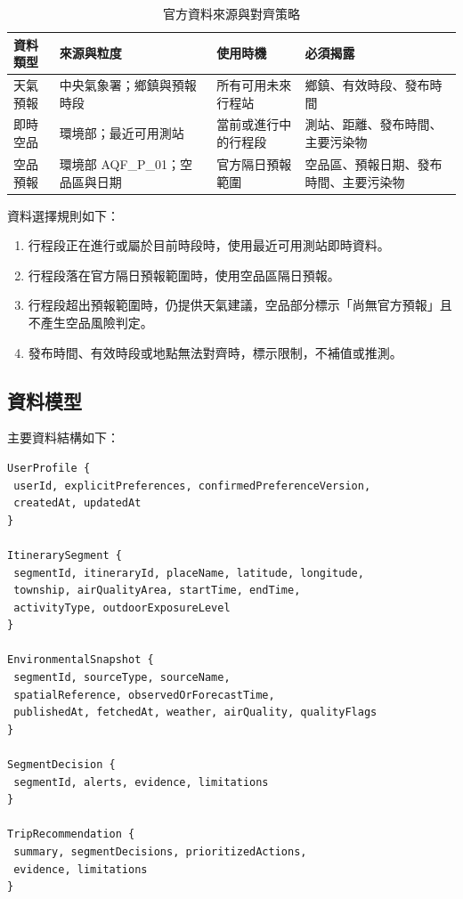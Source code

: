 \documentclass[conference]{IEEEtran}
\begin{document}
\begin{table}[t]
\caption{官方資料來源與對齊策略}
\label{tab:datasources}
\centering
\scriptsize
\begin{tabular}{@{}p{}p{}p{}p{}@{}}
\toprule
\textbf{資料類型} & \textbf{來源與粒度} & \textbf{使用時機} & \textbf{必須揭露} \\
\midrule
天氣預報 & 中央氣象署；鄉鎮與預報時段 & 所有可用未來行程站 & 鄉鎮、有效時段、發布時間 \\
即時空品 & 環境部；最近可用測站 & 當前或進行中的行程段 & 測站、距離、發布時間、主要污染物 \\
空品預報 & 環境部 AQF\_P\_01；空品區與日期 & 官方隔日預報範圍 & 空品區、預報日期、發布時間、主要污染物 \\
\bottomrule
\end{tabular}
\end{table}

資料選擇規則如下：
\begin{enumerate}[leftmargin=*]
\item 行程段正在進行或屬於目前時段時，使用最近可用測站即時資料。
\item 行程段落在官方隔日預報範圍時，使用空品區隔日預報。
\item 行程段超出預報範圍時，仍提供天氣建議，空品部分標示「尚無官方預報」且不產生空品風險判定。
\item 發布時間、有效時段或地點無法對齊時，標示限制，不補值或推測。
\end{enumerate}

\subsection{資料模型}
主要資料結構如下：
\begin{lstlisting}
UserProfile {
 userId, explicitPreferences, confirmedPreferenceVersion,
 createdAt, updatedAt
}

ItinerarySegment {
 segmentId, itineraryId, placeName, latitude, longitude,
 township, airQualityArea, startTime, endTime,
 activityType, outdoorExposureLevel
}

EnvironmentalSnapshot {
 segmentId, sourceType, sourceName,
 spatialReference, observedOrForecastTime,
 publishedAt, fetchedAt, weather, airQuality, qualityFlags
}

SegmentDecision {
 segmentId, alerts, evidence, limitations
}

TripRecommendation {
 summary, segmentDecisions, prioritizedActions,
 evidence, limitations
}
\end{lstlisting}
\end{document}
